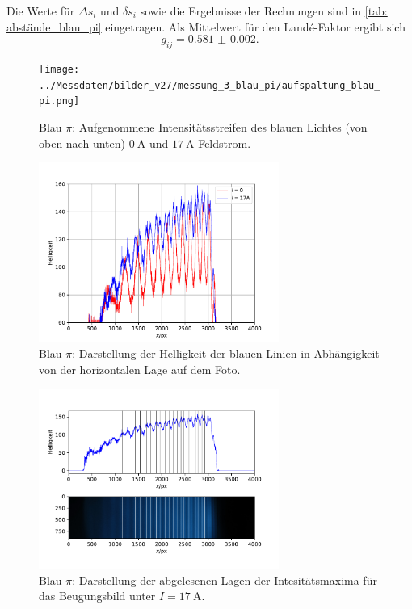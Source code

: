 Die Werte für $\Delta s_i$ und $\delta s_i$ sowie die Ergebnisse der Rechnungen sind in \autoref{tab: abstände_blau_pi} eingetragen.
Als Mittelwert für den Landé-Faktor ergibt sich
\begin{equation}
  g_{ij} = \num{0.581(2)}.
\end{equation}
\begin{figure}
  \centering
  \texttt{[image: ../Messdaten/bilder\_v27/messung\_3\_blau\_pi/aufspaltung\_blau\_pi.png]}
  \caption{Blau $\pi$: Aufgenommene Intensitätsstreifen des blauen Lichtes (von oben nach unten) $\SI{0}{\ampere}$ und $\SI{17}{\ampere}$ Feldstrom.}
  \label{fig: aufspaltung_blau_pi}
\end{figure}
\begin{figure}
  \centering
  \includegraphics[width = 0.7\textwidth]{../Messdaten/plots/blau_pi_intensitaet.pdf}
  \caption{Blau $\pi$: Darstellung der Helligkeit der blauen Linien in Abhängigkeit von der horizontalen Lage auf dem Foto.}
  \label{fig: blau_intensität_pi}
\end{figure}

\begin{figure}
  \centering
  \includegraphics[width = 0.7\textwidth]{../Messdaten/plots/peaks_blau_pi_17.pdf}
  \caption{Blau $\pi$: Darstellung der abgelesenen Lagen der Intesitätsmaxima für das Beugungsbild unter $I =\SI{17}{\ampere}$.}
  \label{fig: peaks_blau_pi_17}
\end{figure}

